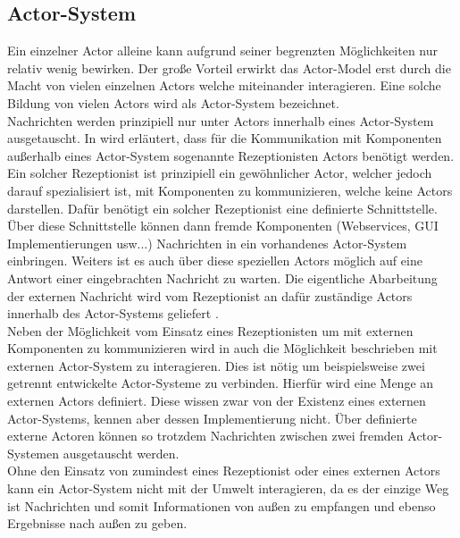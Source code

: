\subsection{Actor-System}\label{actor:actorSystem}
Ein einzelner Actor alleine kann aufgrund seiner begrenzten Möglichkeiten nur relativ wenig bewirken. Der große Vorteil erwirkt das Actor-Model erst durch die Macht von vielen einzelnen Actors welche miteinander interagieren. Eine solche Bildung von vielen Actors wird als Actor-System bezeichnet.\citep{Agha1985ActorsSystems} \\

Nachrichten werden prinzipiell nur unter Actors innerhalb eines Actor-System ausgetauscht. In \cite{Agha1985ActorsSystems} wird erläutert, dass für die Kommunikation mit Komponenten außerhalb eines Actor-System sogenannte Rezeptionisten Actors benötigt werden.\\
Ein solcher Rezeptionist ist prinzipiell ein gewöhnlicher Actor, welcher jedoch darauf spezialisiert ist, mit Komponenten  zu kommunizieren, welche keine Actors darstellen. Dafür benötigt ein solcher Rezeptionist eine definierte Schnittstelle. Über diese Schnittstelle können dann fremde Komponenten (Webservices, GUI Implementierungen  usw...) Nachrichten in ein vorhandenes Actor-System einbringen. Weiters ist es auch über diese speziellen Actors möglich auf eine Antwort einer eingebrachten Nachricht zu warten. Die eigentliche Abarbeitung der externen Nachricht wird vom Rezeptionist an dafür zuständige Actors innerhalb des Actor-Systems geliefert \citep{Agha1985ActorsSystems}.\\
Neben der Möglichkeit vom Einsatz eines Rezeptionisten um mit externen Komponenten zu kommunizieren wird in \cite{Agha1985ActorsSystems} auch die Möglichkeit beschrieben mit externen Actor-System zu interagieren. Dies ist nötig um beispielsweise zwei getrennt entwickelte Actor-Systeme zu verbinden. Hierfür wird eine Menge an externen Actors definiert. Diese wissen zwar von der Existenz eines externen Actor-Systems, kennen aber dessen Implementierung nicht. Über definierte externe Actoren können so trotzdem Nachrichten zwischen zwei fremden Actor-Systemen ausgetauscht werden. \\
Ohne den Einsatz von zumindest eines Rezeptionist oder eines externen Actors kann ein Actor-System nicht mit der Umwelt interagieren, da es der einzige Weg ist Nachrichten und somit Informationen von außen zu empfangen und ebenso Ergebnisse nach außen zu geben. 







